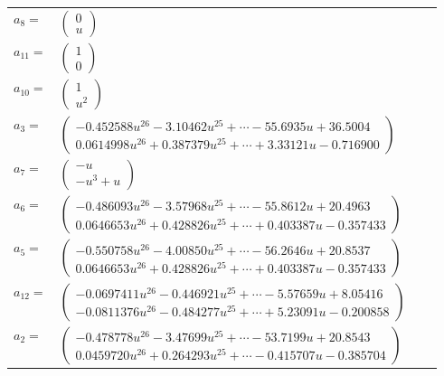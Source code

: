 \documentclass[1p]{elsarticle_modified}
\theoremstyle{definition}
\begin{document}
\begin{tabular}{m{7pt} m{180pt} m{7pt} m{180pt} }
\flushright $a_{8}=$&$\begin{pmatrix}0\\u\end{pmatrix}$ \\
\flushright $a_{11}=$&$\begin{pmatrix}1\\0\end{pmatrix}$ \\
\flushright $a_{10}=$&$\begin{pmatrix}1\\u^2\end{pmatrix}$ \\
\flushright $a_{3}=$&$\begin{pmatrix}-0.452588 u^{26}-3.10462 u^{25}+\cdots-55.6935 u+36.5004\\0.0614998 u^{26}+0.387379 u^{25}+\cdots+3.33121 u-0.716900\end{pmatrix}$ \\
\flushright $a_{7}=$&$\begin{pmatrix}- u\\- u^3+u\end{pmatrix}$ \\
\flushright $a_{6}=$&$\begin{pmatrix}-0.486093 u^{26}-3.57968 u^{25}+\cdots-55.8612 u+20.4963\\0.0646653 u^{26}+0.428826 u^{25}+\cdots+0.403387 u-0.357433\end{pmatrix}$ \\
\flushright $a_{5}=$&$\begin{pmatrix}-0.550758 u^{26}-4.00850 u^{25}+\cdots-56.2646 u+20.8537\\0.0646653 u^{26}+0.428826 u^{25}+\cdots+0.403387 u-0.357433\end{pmatrix}$ \\
\flushright $a_{12}=$&$\begin{pmatrix}-0.0697411 u^{26}-0.446921 u^{25}+\cdots-5.57659 u+8.05416\\-0.0811376 u^{26}-0.484277 u^{25}+\cdots+5.23091 u-0.200858\end{pmatrix}$ \\
\flushright $a_{2}=$&$\begin{pmatrix}-0.478778 u^{26}-3.47699 u^{25}+\cdots-53.7199 u+20.8543\\0.0459720 u^{26}+0.264293 u^{25}+\cdots-0.415707 u-0.385704\end{pmatrix}$ \\

\end{tabular}
\end{document}
